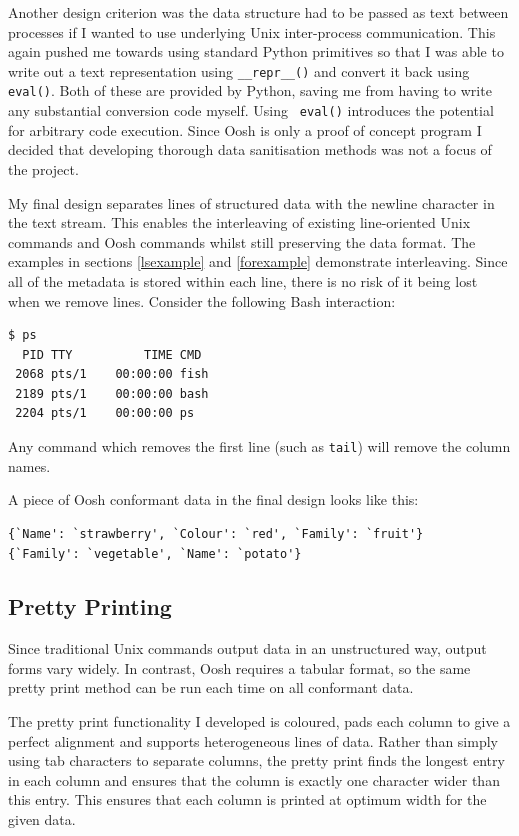 \documentclass[12pt,twoside,notitlepage]{report}
\begin{document}
Another design criterion was the data structure had to be passed as
text between processes if I wanted to use underlying Unix
inter-process communication. This again pushed me towards using
standard Python primitives so that I was able to write out a text
representation using {\tt \_\_repr\_\_()} and convert it back using
{\tt eval()}. Both of these are provided by Python, saving me from
having to write any substantial conversion code myself. Using {\tt
  eval()} introduces the potential for arbitrary code execution. Since
Oosh is only a proof of concept program I decided that developing
thorough data sanitisation methods was not a focus of the project.

My final design separates lines of structured data with the newline
character in the text stream. This enables the interleaving of
existing line-oriented Unix commands and Oosh commands whilst still
preserving the data format. The examples in sections \ref{lsexample}
and \ref{forexample} demonstrate interleaving. Since all of the metadata is
stored within each line, there is no risk of it being lost when we
remove lines. Consider the following Bash interaction:

\begin{verbatim}
$ ps
  PID TTY          TIME CMD
 2068 pts/1    00:00:00 fish
 2189 pts/1    00:00:00 bash
 2204 pts/1    00:00:00 ps
\end{verbatim}

Any command which removes the first line (such as {\tt tail}) will remove
the column names.

A piece of Oosh conformant data in the final design looks like this:

\begin{verbatim}
{`Name': `strawberry', `Colour': `red', `Family': `fruit'}
{`Family': `vegetable', `Name': `potato'}
\end{verbatim}

\subsection{Pretty Printing}
\label{prettyimpl}
Since traditional Unix commands output data in an unstructured way,
output forms vary widely. In contrast, Oosh requires a tabular format,
so the same pretty print method can be run each time on all conformant
data.

The pretty print functionality I developed is coloured, pads each
column to give a perfect alignment and supports heterogeneous lines of
data. Rather than simply using tab characters to separate columns, the
pretty print finds the longest entry in each column and ensures that
the column is exactly one character wider than this entry. This
ensures that each column is printed at optimum width for the given
data.
\end{document}
